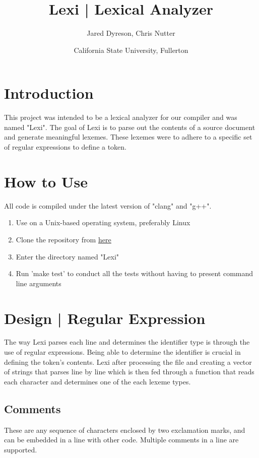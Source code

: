 \documentclass{article}
\title{Lexi | Lexical Analyzer}
\author{Jared Dyreson, Chris Nutter}
\date{California State University, Fullerton}
\begin{document}
\maketitle
\tableofcontents
\newpage

\section{Introduction}
This project was intended to be a lexical analyzer for our compiler and was named "Lexi".
The goal of Lexi is to parse out the contents of a source document and generate meaningful lexemes.
These lexemes were to adhere to a specific set of regular expressions to define a token.

\section{How to Use}

All code is compiled under the latest version of "clang" and "g++".

\begin{enumerate}
		\item Use on a Unix-based operating system, preferably Linux
		\item Clone the repository from \href{https://github.com/JaredsCompiler/Lexi}{\underline{here}}
		\item Enter the directory named "Lexi"
		\item Run 'make test' to conduct all the tests without having to present command line arguments
\end{enumerate}

\section{Design | Regular Expression}
The way Lexi parses each line and determines the identifier type is through the use of regular expressions. 
Being able to determine the identifier is crucial in defining the token's contents.
Lexi after processing the file and creating a vector of strings that parses line by line which is then fed through a function that reads each character and determines one of the each lexeme types.

\subsection{Comments}

These are any sequence of characters enclosed by two exclamation marks, and can be embedded in a line with other code.
Multiple comments in a line are supported.
\end{document}
